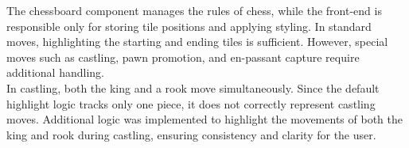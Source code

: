 The chessboard component manages the rules of chess, while the front-end is responsible only for storing tile positions and applying styling. In standard moves, highlighting the starting and ending tiles is sufficient. However, special moves such as \gls{castling}, pawn \gls{promotion}, and \gls{en-passant} capture require additional handling. \\

In \gls{castling}, both the king and a rook move simultaneously. Since the default highlight logic tracks only one piece, it does not correctly represent \gls{castling} moves. Additional logic was implemented to highlight the movements of both the king and rook during \gls{castling}, ensuring consistency and clarity for the user.















